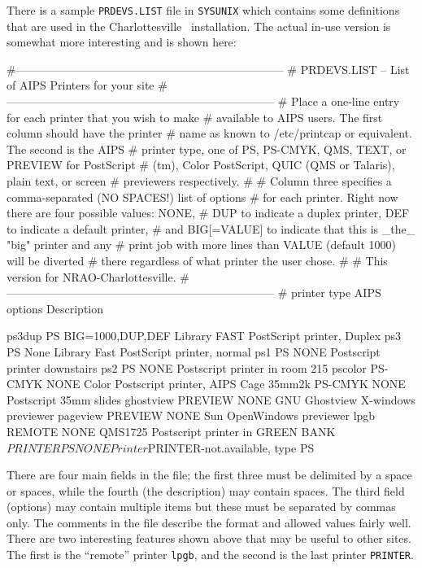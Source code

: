 There is a sample {\tt PRDEVS.LIST} file in {\tt\dol SYSUNIX} which
contains some definitions that are used in the Charlottesville
\AIPS\ installation.  The actual in-use version is somewhat more
interesting and is shown here:\medskip

\fortran
#-----------------------------------------------------------------------
# PRDEVS.LIST -- List of AIPS Printers for your site
#-----------------------------------------------------------------------
# Place a one-line entry for each printer that you wish to make
# available to AIPS users.  The first column should have the printer
# name as known to /etc/printcap or equivalent.  The second is the AIPS
# printer type, one of PS, PS-CMYK, QMS, TEXT, or PREVIEW for PostScript
# (tm), Color PostScript, QUIC (QMS or Talaris), plain text, or screen
# previewers respectively.
#
# Column three specifies a comma-separated (NO SPACES!) list of options
# for each printer.  Right now there are four possible values: NONE,
# DUP to indicate a duplex printer, DEF to indicate a default printer,
# and BIG[=VALUE] to indicate that this is _the_ "big" printer and any
# print job with more lines than VALUE (default 1000) will be diverted
# there regardless of what printer the user chose.
#
# This version for NRAO-Charlottesville.
#-----------------------------------------------------------------------
# printer  type     AIPS options   Description

ps3dup     PS       BIG=1000,DUP,DEF Library FAST PostScript printer, Duplex
ps3        PS       None             Library Fast PostScript printer, normal
ps1        PS       NONE             Postscript printer downstairs
ps2        PS       NONE             Postscript printer in room 215
pscolor    PS-CMYK  NONE             Color Postscript printer, AIPS Cage
35mm2k     PS-CMYK  NONE             Postscript 35mm slides
ghostview  PREVIEW  NONE             GNU Ghostview X-windows previewer
pageview   PREVIEW  NONE             Sun OpenWindows previewer
lpgb       REMOTE   NONE             QMS1725 Postscript printer in GREEN BANK
$PRINTER   PS       NONE             Printer ${PRINTER-not.available}, type PS
\endfortran

\medskip\noindent There are four main fields in the file; the first three
must be delimited by a space or spaces, while the fourth (the description)
may contain spaces.  The third field (options) may contain multiple items
but these must be separated by commas only.  The comments in the file
describe the format and allowed values fairly well.  There are two
interesting features shown above that may be useful to other sites.  The
first is the ``remote'' printer {\tt lpgb}, and the second is the last
printer {\tt\dol PRINTER}.

